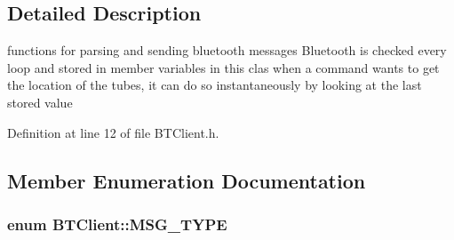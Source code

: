 \subsection{Detailed Description}
functions for parsing and sending bluetooth messages Bluetooth is checked every loop and stored in member variables in this clas when a command wants to get the location of the tubes, it can do so instantaneously by looking at the last stored value 

Definition at line 12 of file B\-T\-Client.\-h.



\subsection{Member Enumeration Documentation}
\hypertarget{classBTClient_aa4e607f3ba1fea67548e2c2864915cb8}{
\subsubsection[{M\-S\-G\-\_\-\-T\-Y\-P\-E}]{\setlength{\rightskip}{0pt plus 5cm}enum {\bf B\-T\-Client\-::\-M\-S\-G\-\_\-\-T\-Y\-P\-E}\hspace{0.3cm}{\ttfamily [private]}}}\label{classBTClient_aa4e607f3ba1fea67548e2c2864915cb8}

